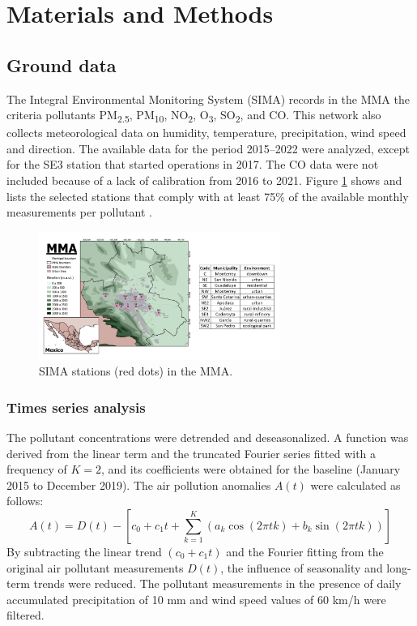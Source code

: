 \documentclass[preprint,12pt]{elsarticle}
\begin{document}
\section{Materials and Methods}
\subsection{Ground data}
The Integral Environmental Monitoring System (SIMA) records in the MMA the criteria pollutants PM\textsubscript{2.5}, PM\textsubscript{10}, NO\textsubscript{2}, O\textsubscript{3}, SO\textsubscript{2}, and CO. This network also collects meteorological data on humidity, temperature, precipitation, wind speed and direction. The available data for the period 2015--2022 were analyzed, except for the SE3 station that started operations in 2017. The CO data were not included because of a lack of calibration from 2016 to 2021. Figure \ref{596247} shows and lists the selected stations that comply with at least 75\% of the available monthly measurements per pollutant \citep{mtodos}.
\begin{figure}[H]
	\begin{center}
		\includegraphics[width=0.70\textwidth]{figures/amm_tabla.png}
		\caption{SIMA stations (red dots) in the MMA.
				{\label{596247}}}
	\end{center}
\end{figure}
\subsubsection{Times series analysis}
The pollutant concentrations were detrended and deseasonalized. A function was derived from the linear term and the truncated Fourier series fitted with a frequency of \(K=2\), and its coefficients were obtained \citep{Hernandez-Paniagua2021} for the baseline (January 2015 to December 2019). The air pollution anomalies \(A\left(t\right)\) were calculated as follows:
\begin{equation}
	A\left(t\right)=D\left(t\right)-\left[c_0+c_1t+ \sum_{k=1}^{K}\left(a_{k}\cos(2\pi tk)+b_{k}\sin(2\pi tk)\right)\right]
	\label{eq:anomalies}
\end{equation}
By subtracting the linear trend \((c_{0}+c_{1}t)\) and the Fourier fitting from the original air pollutant measurements \(D(t)\), the influence of seasonality and long-term trends were reduced. The pollutant measurements in the presence of daily accumulated precipitation of 10 mm and wind speed values of 60 km/h were filtered.
\end{document}
